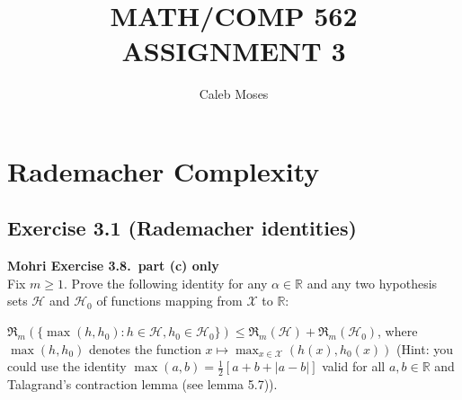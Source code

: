 \documentclass[
10pt, %
a4paper, %
oneside, %
headinclude,footinclude, %
BCOR5mm, %
]{scrartcl}
\author{\spacedlowsmallcaps{Caleb Moses*}} %
\date{} %
\title{MATH/COMP 562 ASSIGNMENT 3}
\author{Caleb Moses}
\newenvironment{problem}[2][]
               { \begin{mdframed}[backgroundcolor=gray!20] \textbf{#1 #2} \\}
               {  \end{mdframed}}
\begin{document}
\maketitle

\section*{Rademacher Complexity}
\subsection*{Exercise 3.1 (Rademacher identities)}
\begin{problem}{Mohri Exercise 3.8.\ part (c) only}
Fix $m \geq 1$. Prove the following identity for any $\alpha \in \mathbb{R}$ and any two hypothesis sets $\mathcal{H}$ and $\mathcal{H}_0$ of functions mapping from $\mathcal{X}$ to $\mathbb{R}$:

$\mathfrak{R}_m(\{\max(h, h_0 ): h \in \mathcal{H}, h_0 \in \mathcal{H}_0 \}) \leq \mathfrak{R}_m (\mathcal{H}) + \mathfrak{R}_m (\mathcal{H}_0)$, where $\max(h, h_0 )$ denotes the function $x \mapsto \max_{x\in \mathcal{X}} (h(x), h_0 (x))$ (Hint: you could use the identity $\max(a, b) = \frac{1}{2} [a + b + |a - b|]$ valid for all $a, b \in \mathbb{R}$ and Talagrand’s contraction lemma (see lemma 5.7)).
\end{problem}
\end{document}
